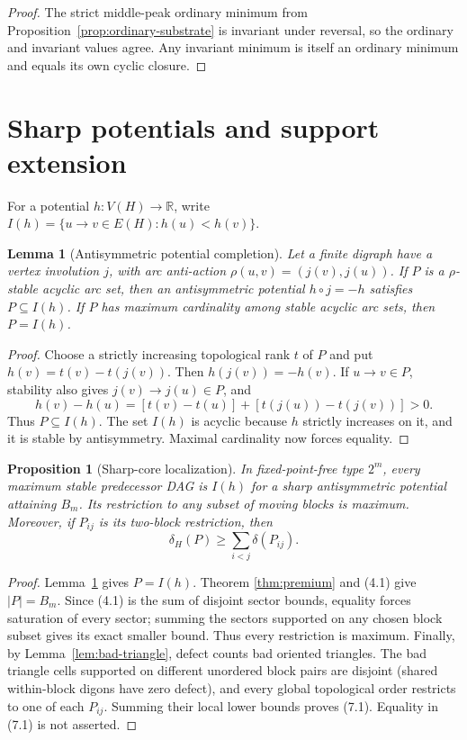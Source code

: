 \documentclass[11pt,a4paper]{article}
\newtheorem{proposition}[theorem]{Proposition}
\newtheorem{lemma}[theorem]{Lemma}
\theoremstyle{remark}
\begin{document}
\begin{proof}
The strict middle-peak ordinary minimum from
Proposition~\ref{prop:ordinary-substrate} is invariant under reversal, so the
ordinary and invariant values agree.  Any invariant minimum is itself an
ordinary minimum and equals its own cyclic closure.
\end{proof}

\section{Sharp potentials and support extension}
\label{sec:extension}

For a potential \(h:V(H)\to\mathbb R\), write
\(I(h)=\{u\to v\in E(H):h(u)<h(v)\}\).

\begin{lemma}[Antisymmetric potential completion]
\label{lem:potential-completion}
Let a finite digraph have a vertex involution \(j\), with arc anti-action
\(\rho(u,v)=(j(v),j(u))\).  If \(P\) is a \(\rho\)-stable acyclic arc set,
then an antisymmetric potential \(h\circ j=-h\) satisfies \(P\subseteq I(h)\).
If \(P\) has maximum cardinality among stable acyclic arc sets, then
\(P=I(h)\).
\end{lemma}

\begin{proof}
Choose a strictly increasing topological rank \(t\) of \(P\) and put
\(h(v)=t(v)-t(j(v))\).  Then \(h(j(v))=-h(v)\).  If \(u\to v\in P\),
stability also gives \(j(v)\to j(u)\in P\), and
\[
 h(v)-h(u)=[t(v)-t(u)]+[t(j(u))-t(j(v))]>0.
\]
Thus \(P\subseteq I(h)\).  The set \(I(h)\) is acyclic because \(h\) strictly
increases on it, and it is stable by antisymmetry.  Maximal cardinality now
forces equality.
\end{proof}

\begin{proposition}[Sharp-core localization]
\label{prop:sharp-core}
In fixed-point-free type \(2^m\), every maximum stable predecessor DAG is
\(I(h)\) for a sharp antisymmetric potential attaining \(B_m\).  Its
restriction to any subset of moving blocks is maximum.  Moreover, if
\(P_{ij}\) is its two-block restriction, then
\[
 \delta_H(P)\geq\sum_{i<j}\delta(P_{ij}).              \tag{7.1}
\]
\end{proposition}

\begin{proof}
Lemma~\ref{lem:potential-completion} gives \(P=I(h)\).  Theorem
\ref{thm:premium} and (4.1) give \(|P|=B_m\).  Since (4.1) is the sum of
disjoint sector bounds, equality forces saturation of every sector; summing
the sectors supported on any chosen block subset gives its exact smaller
bound.  Thus every restriction is maximum.  Finally, by
Lemma~\ref{lem:bad-triangle}, defect counts bad oriented triangles.  The
bad triangle cells supported on different unordered block pairs are disjoint
(shared within-block digons have zero defect), and every global topological
order restricts to one of each \(P_{ij}\).  Summing their local lower bounds
proves (7.1).  Equality in (7.1) is not asserted.
\end{proof}
\end{document}
